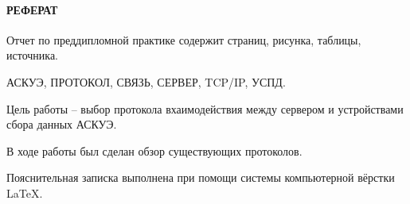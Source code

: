 \newpage
{}
\paragraph*{\hfill РЕФЕРАТ \hfill}
Отчет по преддипломной практике содержит  страниц,  рисунка,   таблицы,  источника. %

АСКУЭ, ПРОТОКОЛ, СВЯЗЬ, СЕРВЕР, TCP/IP, УСПД.

Цель работы -- выбор протокола вхаимодействия между сервером и устройствами сбора данных АСКУЭ.

В ходе работы был сделан обзор существующих протоколов.

Пояснительная записка выполнена при помощи системы компьютерной вёрстки \LaTeX.